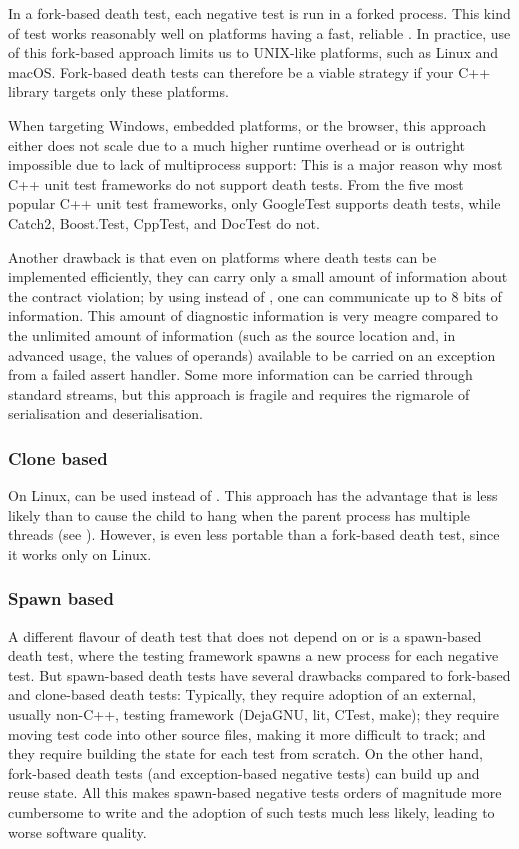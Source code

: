 In a fork-based death test, each negative test is run in a forked process. This kind of test works reasonably well on platforms having a fast, reliable . In practice, use of this fork-based approach limits us to UNIX-like platforms, such as Linux and macOS. Fork-based death tests can therefore be a viable strategy if your C++ library targets only these platforms.

When targeting Windows, embedded platforms, or the browser, this approach either does not scale due to a much higher runtime overhead or is outright impossible due to lack of multiprocess support: This is a major reason why most C++ unit test frameworks do not support death tests. From the five most popular C++ unit test frameworks, only GoogleTest supports death tests, while Catch2, Boost.Test, CppTest, and DocTest do not.

Another drawback is that even on platforms where death tests can be implemented efficiently, they can carry only a small amount of information about the contract violation; by using  instead of , one can communicate up to 8 bits of information. This amount of diagnostic information is very meagre compared to the unlimited amount of information (such as the source location and, in advanced usage, the values of operands) available to be carried on an exception from a failed assert handler. Some more information can be carried through standard streams, but this approach is fragile and requires the rigmarole of serialisation and deserialisation.

\subsubsection{Clone based}

On Linux,  can be used instead of . This approach has the advantage that  is less likely than  to cause the child to hang when the parent process has multiple threads (see \cite{GTestDocDeathTests}). However,  is even less portable than a fork-based death test, since it works only on Linux.

\subsubsection{Spawn based}

A different flavour of death test that does not depend on  or  is a spawn-based death test, where the testing framework spawns a new process for each negative test. But spawn-based death tests have several drawbacks compared to fork-based and clone-based death tests: Typically, they require adoption of an external, usually non-C++, testing framework (DejaGNU, lit, CTest, make); they require moving test code into other source files, making it more difficult to track; and they require building the state for each test from scratch. On the other hand, fork-based death tests (and exception-based negative tests) can build up and reuse state. All this makes spawn-based negative tests orders of magnitude more cumbersome to write and the adoption of such tests much less likely, leading to worse software quality.


